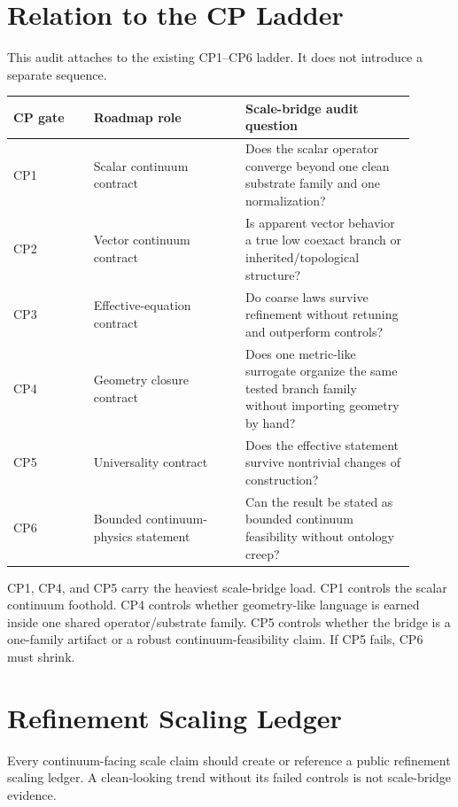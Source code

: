 \documentclass[11pt]{article}
\begin{document}
\section{Relation to the CP Ladder}

This audit attaches to the existing CP1--CP6 ladder. It does not introduce a separate sequence.

\begin{longtable}{p{0.18\linewidth}p{0.34\linewidth}p{0.38\linewidth}}
\toprule
CP gate & Roadmap role & Scale-bridge audit question \\
\midrule
CP1 & Scalar continuum contract & Does the scalar operator converge beyond one clean substrate family and one normalization? \\
CP2 & Vector continuum contract & Is apparent vector behavior a true low coexact branch or inherited/topological structure? \\
CP3 & Effective-equation contract & Do coarse laws survive refinement without retuning and outperform controls? \\
CP4 & Geometry closure contract & Does one metric-like surrogate organize the same tested branch family without importing geometry by hand? \\
CP5 & Universality contract & Does the effective statement survive nontrivial changes of construction? \\
CP6 & Bounded continuum-physics statement & Can the result be stated as bounded continuum feasibility without ontology creep? \\
\bottomrule
\end{longtable}

CP1, CP4, and CP5 carry the heaviest scale-bridge load. CP1 controls the scalar continuum foothold. CP4 controls whether geometry-like language is earned inside one shared operator/substrate family. CP5 controls whether the bridge is a one-family artifact or a robust continuum-feasibility claim. If CP5 fails, CP6 must shrink.

\section{Refinement Scaling Ledger}

Every continuum-facing scale claim should create or reference a public refinement scaling ledger. A clean-looking trend without its failed controls is not scale-bridge evidence.
\end{document}
